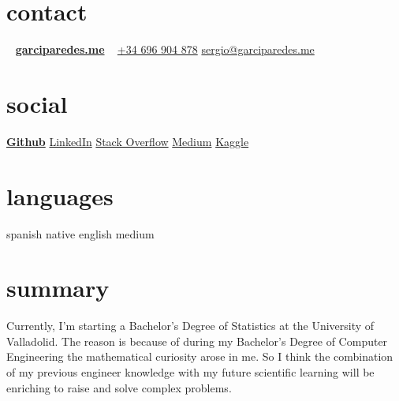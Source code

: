 \documentclass{friggeri-cv}
\begin{document}


    \begin{aside}

        \section{contact}
            ~
            \href{http://garciparedes.me}{\textbf{garciparedes.me}}
            ~
            \href{tel:+34 696 904 878}{+34 696 904 878}
            \href{mailto:sergio@garciparedes.me}{sergio@garciparedes.me}
        \section{social}
            \href{https://github.com/garciparedes}{\quad{\color{red} $\varheartsuit$}\quad\textbf{Github}\quad\faGithub }
            \href{https://es.linkedin.com/in/garciparedes/en}{LinkedIn\quad\faLinkedin }
            \href{http://stackoverflow.com/users/3921457/garciparedes}{Stack Overflow\quad\faStackOverflow }
            \href{https://medium.com/@garciparedes}{Medium\quad\faMedium }
            \href{https://www.kaggle.com/garciparedes}{Kaggle\quad\faTrophy }
        \section{languages}
            spanish native
            english medium
    \end{aside}




    \section{summary}

        Currently, I'm starting a Bachelor's Degree of Statistics at the University of Valladolid. The reason is because of during my Bachelor's Degree of Computer Engineering the mathematical curiosity arose in me. So I think the combination of my previous engineer knowledge with my future scientific learning will be enriching to raise and solve complex problems.
\end{document}
